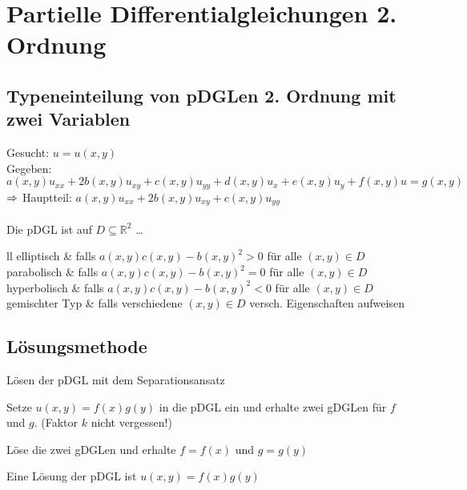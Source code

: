 \documentclass[german,color,5pt]{latex4ei/latex4ei_fs}
\begin{document}
\section{Partielle Differentialgleichungen 2. Ordnung}
\begin{sectionbox}
	\subsection{Typeneinteilung von pDGLen 2. Ordnung mit zwei Variablen}
	Gesucht: $u=u(x,y)$ \\
	Gegeben: $a(x,y)u_{xx}+2b(x,y)u_{xy}+c(x,y)u_{yy}+d(x,y)u_{x}+e(x,y)u_{y}+f(x,y)u=g(x,y)$\\
	$\Rightarrow$ Hauptteil: $a(x,y)u_{xx}+2b(x,y)u_{xy}+c(x,y)u_{yy}$ \\ \\
	Die pDGL ist auf $D\subseteq \mathbb{R}^2$ \dots
	\begin{tablebox}{ll}
		elliptisch & falls $a(x,y)c(x,y)-b(x,y)^2>0 $ für alle $(x,y) \in D $ \\
		parabolisch & falls $a(x,y)c(x,y)-b(x,y)^2=0 $ für alle $(x,y) \in D $ \\
		hyperbolisch & falls $a(x,y)c(x,y)-b(x,y)^2<0 $ für alle $(x,y) \in D $ \\
		gemischter Typ & falls verschiedene $(x,y) \in D $ versch. Eigenschaften aufweisen
	\end{tablebox}
	
	\subsection{Lösungsmethode}
	\begin{cookbox}{Lösen der pDGL mit dem Separationsansatz}
		\item Setze $u(x,y)=f(x)g(y) $ in die pDGL ein und erhalte zwei gDGLen für $f$ und $g$. (Faktor $k$ nicht vergessen!)
		\item Löse die zwei gDGLen und erhalte $f=f(x)$ und $g=g(y) $
		\item Eine Lösung der pDGL ist $u(x,y)=f(x)g(y) $
	\end{cookbox}
\end{sectionbox}

\end{document}
